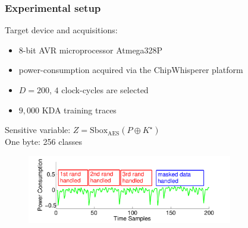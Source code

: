 \begin{frame}
\frametitle{Experimental setup}
Target device and acquisitions: 

\begin{itemize}
\item 8-bit AVR microprocessor Atmega328P
\item power-consumption acquired via the ChipWhisperer \cite{o2014chipwhisperer} platform
\item $D = 200$, $4$ clock-cycles are selected
\item $9,000$ KDA training traces
\end{itemize}

Sensitive variable: $Z = \mathrm{Sbox_{AES}}(P\oplus K^{\star})$\\
One byte: 256 classes
%
\begin{figure}
\includegraphics[width=0.8\textwidth]{figures/one_trace.pdf}
\end{figure}


\end{frame}

